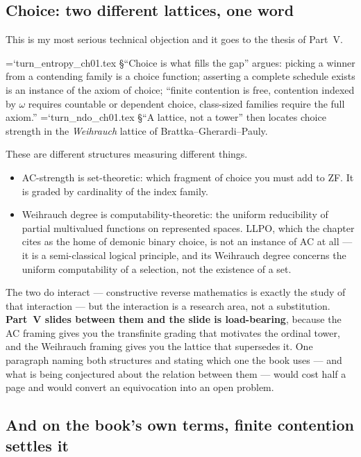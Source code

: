 \documentclass[11pt,letterpaper]{article}
\newcommand{\loc}[1]{{\small\ttfamily\color{accent}\hyphenchar\font=`\-\relax #1}}
\newcommand{\fnd}[1]{\textbf{\color{warn}#1}}
\begin{document}
\subsection*{Choice: two different lattices, one word}

This is my most serious technical objection and it goes to the thesis
of Part~V.

\loc{turn\_entropy\_ch01.tex} \S``Choice is what fills the gap'' argues:
picking a winner from a contending family is a choice function;
asserting a complete schedule exists is an instance of the axiom of
choice; ``finite contention is free, contention indexed by $\omega$
requires countable or dependent choice, class-sized families require
the full axiom.'' \loc{turn\_ndo\_ch01.tex} \S``A lattice, not a
tower'' then locates choice strength in the \emph{Weihrauch} lattice
of Brattka--Gherardi--Pauly.

These are different structures measuring different things.

\begin{itemize}[leftmargin=1.2em,itemsep=3pt]
\item AC-strength is set-theoretic: which fragment of choice you must
      add to ZF. It is graded by cardinality of the index family.
\item Weihrauch degree is computability-theoretic: the uniform
      reducibility of partial multivalued functions on represented
      spaces. \textsf{LLPO}, which the chapter cites as the home of
      demonic binary choice, is not an instance of AC at all --- it is
      a semi-classical logical principle, and its Weihrauch degree
      concerns the uniform computability of a selection, not the
      existence of a set.
\end{itemize}

The two do interact --- constructive reverse mathematics is exactly the
study of that interaction --- but the interaction is a research area,
not a substitution. \fnd{Part~V slides between them and the slide is
load-bearing}, because the AC framing gives you the transfinite grading
that motivates the ordinal tower, and the Weihrauch framing gives you
the lattice that supersedes it. One paragraph naming both structures
and stating which one the book uses --- and what is being conjectured
about the relation between them --- would cost half a page and would
convert an equivocation into an open problem.

\subsection*{And on the book's own terms, finite contention settles it}
\end{document}
